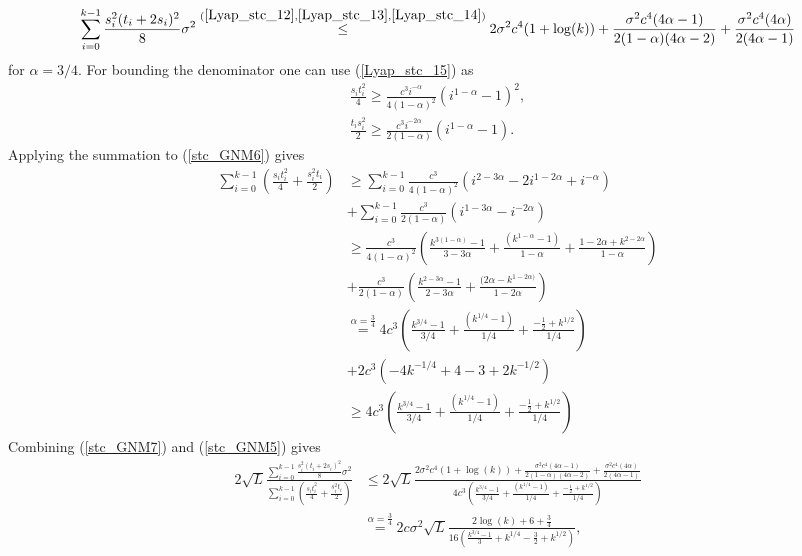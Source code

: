 \documentclass{article}
\theoremstyle{plain}
\theoremstyle{definition}
\theoremstyle{remark}
\begin{document}
\begin{align}\label{stc_GNM5}
    \sum_{i=0}^{k-1} \frac{s_i^2(t_i+2s_i)^2}{8}\sigma^2\overset{(\ref{Lyap_stc_12},\ref{Lyap_stc_13},\ref{Lyap_stc_14})}{\leq}2\sigma^2c^4(1+\log (k))+\frac{\sigma^2c^4(4\alpha -1)}{2(1-\alpha)(4\alpha -2)}+\frac{\sigma^2c^4(4\alpha )}{2(4\alpha -1)}
\end{align}
for $\alpha=3/4$. For bounding the denominator one can use (\ref{Lyap_stc_15}) as
        \begin{align}\label{stc_GNM6}
             \frac{s_it_i^2}{4}\geq \frac{c^3i^{-\alpha}}{4(1-\alpha)^2}(i^{1-\alpha}-1)^2,\nonumber\\
             \frac{t_is_i^2}{2}\geq \frac{c^3i^{-2\alpha}}{2(1-\alpha)}(i^{1-\alpha}-1).
         \end{align}
Applying the summation to (\ref{stc_GNM6}) gives
\begin{align}\label{stc_GNM7}
    \sum_{i=0}^{k-1}\left(\frac{s_it_i^2}{4}+\frac{s_i^2t_i}{2}\right)&\geq  \sum_{i=0}^{k-1} \frac{c^3}{4(1-\alpha)^2}(i^{2-3\alpha}-2i^{1-2\alpha}+i^{-\alpha})\nonumber\\
    & + \sum_{i=0}^{k-1} \frac{c^3}{2(1-\alpha)}(i^{1-3\alpha}-i^{-2\alpha})\nonumber\\
    &\geq \frac{c^3}{4(1-\alpha)^2}\left( \frac{k^{3(1-\alpha)}-1}{3-3\alpha} +\frac{(k^{1-\alpha}-1)}{1-\alpha}+\frac{1-2\alpha+k^{2-2\alpha}}{1-\alpha}\right)\nonumber\\
    &+\frac{c^3}{2(1-\alpha)}\left( \frac{k^{2-3\alpha}-1}{2-3\alpha} +\frac{(2\alpha-k^{1-2\alpha)}}{1-2\alpha}\right)\nonumber\\
    &\overset{\alpha=\tfrac{3}{4}}{=} 4c^3\left( \frac{k^{3/4}-1}{3/4} +\frac{(k^{1/4}-1)}{1/4}+\frac{-\tfrac{1}{2}+k^{1/2}}{1/4}\right)\nonumber\\
    &+2c^3\left( -4k^{-1/4}+4 -3+2k^{-1/2}\right)\nonumber\\
    &\geq 4c^3\left( \frac{k^{3/4}-1}{3/4} +\frac{(k^{1/4}-1)}{1/4}+\frac{-\tfrac{1}{2}+k^{1/2}}{1/4}\right)
\end{align}
Combining (\ref{stc_GNM7}) and (\ref{stc_GNM5}) gives
\begin{align}\label{stc_GNM8}
  2\sqrt{L}  \frac{ \sum_{i=0}^{k-1} \frac{s_i^2(t_i+2s_i)^2}{8}\sigma^2}{\sum_{i=0}^{k-1}\left(\frac{s_it_i^2}{4}+\frac{s_i^2t_i}{2}\right)}&\leq 2\sqrt{L}\frac{2\sigma^2c^4(1+\log (k))+\frac{\sigma^2c^4(4\alpha -1)}{2(1-\alpha)(4\alpha -2)}+\frac{\sigma^2c^4(4\alpha )}{2(4\alpha -1)}}{4c^3\left( \frac{k^{3/4}-1}{3/4} +\frac{(k^{1/4}-1)}{1/4}+\frac{-\tfrac{1}{2}+k^{1/2}}{1/4}\right)}\nonumber\\
  &\overset{\alpha=\tfrac{3}{4}}{=} 2c\sigma^2\sqrt{L}\frac{2\log (k)+6+\frac{3}{4}}{16\left( \frac{k^{3/4}-1}{3} +k^{1/4}-\frac{3}{2}+k^{1/2}\right)},
\end{align}
\end{document}
